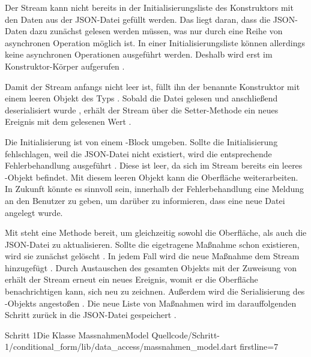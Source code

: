 Der Stream kann nicht bereits in der Initialisierungsliste des Konstruktors mit den Daten aus der JSON-Datei gefüllt werden.
Das liegt daran, dass die JSON-Daten dazu zunächst gelesen werden müssen, was nur durch eine Reihe von asynchronen Operation möglich ist.
In einer Initialisierungsliste können allerdings keine asynchronen Operationen ausgeführt werden.
Deshalb wird  erst im Konstruktor-Körper aufgerufen .

Damit der Stream anfangs nicht leer ist, füllt ihn der benannte Konstruktor  mit einem leeren Objekt des Typs  .
Sobald die Datei gelesen  und anschließend deserialisiert wurde , erhält der Stream über die Setter-Methode  ein neues Ereignis mit dem gelesenen Wert .

Die Initialisierung ist von einem -Block umgeben.
Sollte die Initialisierung fehlschlagen, weil die JSON-Datei nicht existiert, wird die entsprechende Fehlerbehandlung ausgeführt .
Diese ist leer, da sich im Stream bereits ein leeres -Objekt  befindet.
Mit diesem leeren Objekt kann die Oberfläche weiterarbeiten.
In Zukunft könnte es sinnvoll sein, innerhalb der Fehlerbehandlung eine Meldung an den Benutzer zu geben, um darüber zu informieren, dass eine neue Datei angelegt wurde.

Mit   steht eine Methode bereit, um gleichzeitig  sowohl die Oberfläche,  als auch die JSON-Datei zu aktualisieren.
Sollte die eigetragene Maßnahme schon existieren, wird sie zunächst gelöscht .
In jedem Fall wird die neue Maßnahme dem Stream hinzugefügt .
Durch Austauschen des gesamten Objekts mit der Zuweisung von   erhält der Stream erneut ein neues Ereignis, womit er die Oberfläche benachrichtigen kann, sich neu zu zeichnen. Außerdem wird die Serialisierung des -Objekts angestoßen . Die neue Liste von Maßnahmen wird im darauffolgenden Schritt zurück in die JSON-Datei gespeichert .

\begin{alexlisting}{Schritt 1}{Die Klasse MassnahmenModel}
  {Quellcode/Schritt-1/conditional_form/lib/data_access/massnahmen_model.dart}
  {firstline=7}
  \label{lst:Schritt1KlasseMassnahmenModel}
\end{alexlisting}

\ifIncludeFigures \clearpage \fi
